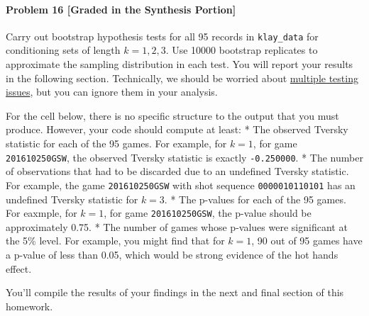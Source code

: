 \documentclass[11pt]{article}
\begin{document}
    \paragraph{Problem 16 {[}Graded in the Synthesis
Portion{]}}\label{problem-16-graded-in-the-synthesis-portion}

Carry out bootstrap hypothesis tests for all 95 records in
\texttt{klay\_data} for conditioning sets of length \(k=1,2,3\). Use
10000 bootstrap replicates to approximate the sampling distribution in
each test. You will report your results in the following section.
Technically, we should be worried about
\href{https://en.wikipedia.org/wiki/Multiple_comparisons_problem}{multiple
testing issues}, but you can ignore them in your analysis.

For the cell below, there is no specific structure to the output that
you must produce. However, your code should compute at least: * The
observed Tversky statistic for each of the 95 games. For example, for
\(k = 1\), for game
\texttt{\textquotesingle{}201610250GSW\textquotesingle{}}, the observed
Tversky statistic is exactly \texttt{-0.250000}. * The number of
observations that had to be discarded due to an undefined Tversky
statistic. For example, the game
\texttt{\textquotesingle{}201610250GSW\textquotesingle{}} with shot
sequence \texttt{\textquotesingle{}0000010110101\textquotesingle{}} has
an undefined Tversky statistic for \(k = 3\). * The p-values for each of
the 95 games. For eaxmple, for \(k=1\), for game
\texttt{\textquotesingle{}201610250GSW\textquotesingle{}}, the p-value
should be approximately 0.75. * The number of games whose p-values were
significant at the 5\% level. For example, you might find that for
\(k=1\), 90 out of 95 games have a p-value of less than 0.05, which
would be strong evidence of the hot hands effect.

You'll compile the results of your findings in the next and final
section of this homework.
\end{document}
